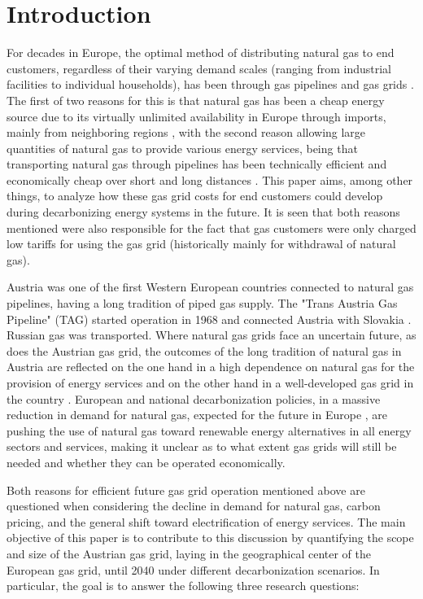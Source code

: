 \section{Introduction}
For decades in Europe, the optimal method of distributing natural gas to end customers, regardless of their varying demand scales (ranging from industrial facilities to individual households), has been through gas pipelines and gas grids \cite{rajnauth2008gas}. The first of two reasons for this is that natural gas has been a cheap energy source due to its virtually unlimited availability in Europe through imports, mainly from neighboring regions \cite{bilgin2009geopolitics}, with the second reason allowing large quantities of natural gas to provide various energy services, being that transporting natural gas through pipelines has been technically efficient and economically cheap over short and long distances \cite{thomas2003review}. This paper aims, among other things, to analyze how these gas grid costs for end customers could develop during decarbonizing energy systems in the future. It is seen that both reasons mentioned were also responsible for the fact that gas customers were only charged low tariffs for using the gas grid (historically mainly for withdrawal of natural gas).\vspace{0.3cm}
 
Austria was one of the first Western European countries connected to natural gas pipelines, having a long tradition of piped gas supply. The "Trans Austria Gas Pipeline" (TAG) started operation in 1968 and connected Austria with Slovakia \cite{gas_connect_austria}. Russian gas was transported. Where natural gas grids face an uncertain future, as does the Austrian gas grid, the outcomes of the long tradition of natural gas in Austria are reflected on the one hand in a high dependence on natural gas for the provision of energy services \cite{eurostat_natural_gas} and on the other hand in a well-developed gas grid in the country \cite{econtrol_grid}. European and national decarbonization policies, in a massive reduction in demand for natural gas, expected for the future in Europe \cite{repowereu}, are pushing the use of natural gas toward renewable energy alternatives in all energy sectors and services, making it unclear as to what extent gas grids will still be needed and whether they can be operated economically.\vspace{0.3cm}

Both reasons for efficient future gas grid operation mentioned above are questioned when considering the decline in demand for natural gas, carbon pricing, and the general shift toward electrification of energy services. The main objective of this paper is to contribute to this discussion by quantifying the scope and size of the Austrian gas grid, laying in the geographical center of the European gas grid, until 2040 under different decarbonization scenarios. In particular, the goal is to answer the following three research questions:

